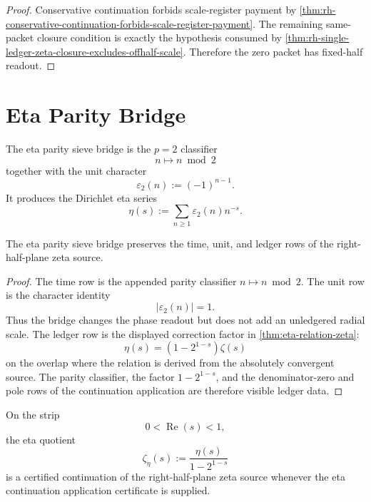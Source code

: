 \begin{proof}
Conservative continuation forbids scale-register payment by
\autoref{thm:rh-conservative-continuation-forbids-scale-register-payment}.
The remaining same-packet closure condition is exactly the hypothesis
consumed by
\autoref{thm:rh-single-ledger-zeta-closure-excludes-offhalf-scale}.
Therefore the zero packet has fixed-half readout.
\end{proof}

\section{Eta Parity Bridge}
\label{sec:rh-analytic-continuation-eta-parity-bridge}

\begin{definition}
\label{def:rh-eta-parity-sieve-bridge}
The eta parity sieve bridge is the $p=2$ classifier
$$
n\longmapsto n\bmod2
$$
together with the unit character
$$
\varepsilon_2(n):=(-1)^{n-1}.
$$
It produces the Dirichlet eta series
$$
\eta(s):=\sum_{n\ge1}\varepsilon_2(n)n^{-s}.
$$
\end{definition}

\begin{theorem}
\label{thm:rh-eta-bridge-preserves-bedc-rows}
The eta parity sieve bridge preserves the time, unit, and ledger rows
of the right-half-plane zeta source.
\end{theorem}

\begin{proof}
The time row is the appended parity classifier
$n\mapsto n\bmod2$.  The unit row is the character identity
$$
|\varepsilon_2(n)|=1.
$$
Thus the bridge changes the phase readout but does not add an
unledgered radial scale.  The ledger row is the displayed correction
factor in
\autoref{thm:eta-relation-zeta}:
$$
\eta(s)=(1-2^{1-s})\zeta(s)
$$
on the overlap where the relation is derived from the absolutely
convergent source.  The parity classifier, the factor $1-2^{1-s}$, and
the denominator-zero and pole rows of the continuation application are
therefore visible ledger data.
\end{proof}

\begin{theorem}
\label{thm:rh-eta-continuation-certified-critical-strip-zeta}
On the strip
$$
0<\operatorname{Re}(s)<1,
$$
the eta quotient
$$
\zeta_{\eta}(s):=\frac{\eta(s)}{1-2^{1-s}}
$$
is a certified continuation of the right-half-plane zeta source
whenever the eta continuation application certificate is supplied.
\end{theorem}

